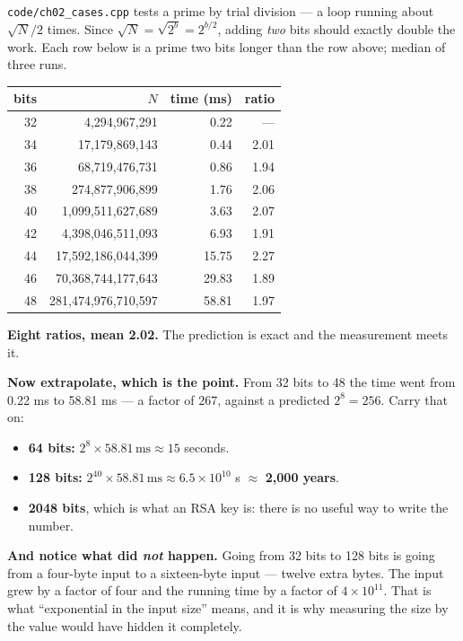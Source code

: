 \begin{worked}
\texttt{code/ch02\_cases.cpp} tests a prime by trial division --- a loop running
about $\sqrt{N}/2$ times. Since $\sqrt{N} = \sqrt{2^{b}} = 2^{b/2}$, adding
\emph{two} bits should exactly double the work. Each row below is a prime two
bits longer than the row above; median of three runs.

\begin{center}
\begin{tabular}{@{}rrrr@{}}
\toprule
\rowcolor{primary!15}
bits & $N$ & time (ms) & ratio \\
\midrule
32 & 4{,}294{,}967{,}291     &  0.22 & ---  \\
34 & 17{,}179{,}869{,}143    &  0.44 & 2.01 \\
36 & 68{,}719{,}476{,}731    &  0.86 & 1.94 \\
38 & 274{,}877{,}906{,}899   &  1.76 & 2.06 \\
40 & 1{,}099{,}511{,}627{,}689 & 3.63 & 2.07 \\
42 & 4{,}398{,}046{,}511{,}093 & 6.93 & 1.91 \\
44 & 17{,}592{,}186{,}044{,}399 & 15.75 & 2.27 \\
46 & 70{,}368{,}744{,}177{,}643 & 29.83 & 1.89 \\
48 & 281{,}474{,}976{,}710{,}597 & 58.81 & 1.97 \\
\bottomrule
\end{tabular}
\end{center}

\smallskip
\textbf{Eight ratios, mean 2.02.} The prediction is exact and the measurement
meets it.

\smallskip
\textbf{Now extrapolate, which is the point.} From 32 bits to 48 the time went
from 0.22 ms to 58.81 ms --- a factor of 267, against a predicted $2^{8} =
256$. Carry that on:
\begin{itemize}[leftmargin=1.6em, itemsep=1pt, topsep=2pt]
  \item \textbf{64 bits:} $2^{8} \times 58.81\,\text{ms} \approx 15$ seconds.
  \item \textbf{128 bits:} $2^{40} \times 58.81\,\text{ms} \approx 6.5 \times
        10^{10}$ s $\approx$ \textbf{2{,}000 years}.
  \item \textbf{2048 bits}, which is what an RSA key is: there is no useful way
        to write the number.
\end{itemize}

\smallskip
\textbf{And notice what did \emph{not} happen.} Going from 32 bits to 128 bits
is going from a four-byte input to a sixteen-byte input --- twelve extra bytes.
The input grew by a factor of four and the running time by a factor of $4
\times 10^{11}$. That is what ``exponential in the input size'' means, and it
is why measuring the size by the value would have hidden it completely.
\end{worked}

